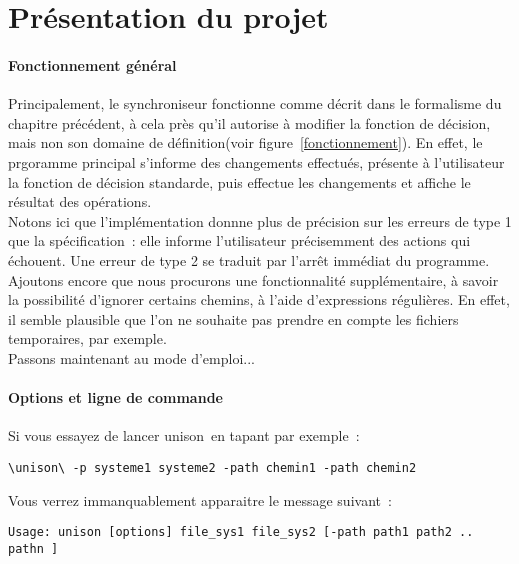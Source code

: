 \documentclass[11pt]{report}
\newcommand{\unison}{unison}
\begin{document}
{\section{Pr\'esentation du projet}
\paragraph{Fonctionnement g\'en\'eral\\}
Principalement, le synchroniseur fonctionne comme d\'ecrit dans le formalisme
du chapitre pr\'ec\'edent, \`a cela pr\`es qu'il autorise \`a modifier la 
fonction de d\'ecision, mais non son domaine de d\'efinition(voir figure~\ref{fonctionnement}).
En effet, le prgoramme principal s'informe des changements effectu\'es,
pr\'esente \`a l'utilisateur la fonction de d\'ecision standarde, puis effectue
les changements et affiche le r\'esultat des op\'erations.\\
Notons ici que l'impl\'ementation donnne plus de pr\'ecision sur les erreurs 
de type 1 que la sp\'ecification~: elle informe l'utilisateur pr\'ecisemment 
des actions qui \'echouent. Une erreur de type 2 se traduit par l'arr\^et 
imm\'ediat du programme.\\
Ajoutons encore que nous procurons une fonctionnalit\'e suppl\'ementaire, \`a
savoir la possibilit\'e d'ignorer certains chemins, \`a l'aide d'expressions
r\'eguli\`eres. En effet, il semble plausible que l'on ne souhaite pas prendre
en compte les fichiers temporaires, par exemple.\\
Passons maintenant au mode d'emploi...
\paragraph{Options et ligne de commande\\}
Si vous essayez de lancer \unison\ en tapant par exemple~:
\begin{verbatim}
\unison\ -p systeme1 systeme2 -path chemin1 -path chemin2
\end{verbatim}
Vous verrez immanquablement apparaitre le message suivant~:\\
\begin{verbatim}
Usage: unison [options] file_sys1 file_sys2 [-path path1 path2 .. pathn ]


\end{verbatim}}
\end{document}
